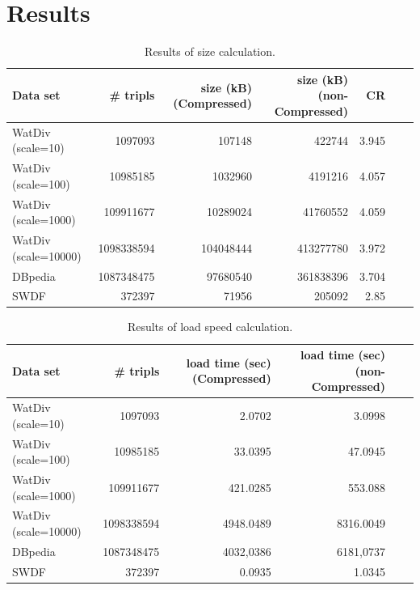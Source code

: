 \section{Results}
\label{sec:results}

\begin{table}[h]
	\setlength{\tabcolsep}{1ex}
	\begin{tabular}{lrrrrrl}
		\toprule
		Data set& \# tripls & size (kB) (Compressed) &size (kB) (non-Compressed)& CR\\
		\midrule
		WatDiv (scale=10) &  1097093& 	107148	& 422744& 	3.945 \\ %
		WatDiv (scale=100) & 10985185&	1032960	&4191216&	4.057  \\ %
		WatDiv (scale=1000) & 109911677	&10289024&	41760552&	4.059 \\ 
		WatDiv (scale=10000) & 1098338594&	104048444	&413277780&	3.972\\ 
		DBpedia  & 1087348475	&97680540&	361838396&	3.704&\\ 
		SWDF  & 372397&	71956&	205092	&2.85\\ 
		\bottomrule
	\end{tabular}
	\caption{Results of size calculation. }
	\label{tab:result_table_size}
\end{table}

\begin{table}[h]
	\setlength{\tabcolsep}{1ex}
	\begin{tabular}{lrrrrl}
		\toprule
		Data set& \# tripls & load time (sec) (Compressed) & load time (sec) (non-Compressed) \\
		\midrule
		WatDiv (scale=10) &  1097093& 	2.0702	& 3.0998 \\ %
		WatDiv (scale=100) & 10985185&	33.0395	& 47.0945  \\ %
		WatDiv (scale=1000) & 109911677	&421.0285	& 553.088 \\ 
		WatDiv (scale=10000)& 1098338594 & 4948.0489	& 8316.0049\\ 
		DBpedia  & 1087348475	&4032,0386& 	6181,0737\\ 
		SWDF  & 372397&	0.0935& 1.0345\\ 
		\bottomrule
	\end{tabular}
	\caption{Results of load speed calculation. }
	\label{tab:result_table_load_speed}
\end{table}


